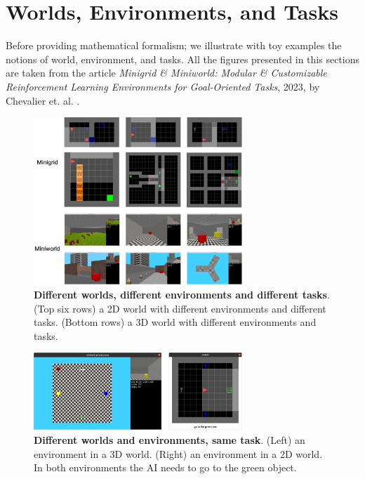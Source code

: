 \documentclass[10pt]{article} %
\begin{document}
\section{Worlds, Environments, and Tasks}
Before providing mathematical formalism; we illustrate with toy examples the notions of world, environment, and tasks.
All the figures presented in this sections are taken from the article \textit{Minigrid \& Miniworld: Modular \& Customizable Reinforcement Learning Environments for Goal-Oriented Tasks}, 2023, by Chevalier et. al. .
\begin{figure}
\centering
\includegraphics[width=0.7\textwidth]{figures/minigrid_miniworld_alt.png}
\caption{\textbf{Different worlds, different environments and different tasks}. (Top six rows) a 2D world with different environments and different tasks.
(Bottom rows) a 3D world with different environments and tasks.}
\end{figure}

\begin{figure}
  \centering
  \includegraphics[width=0.7\textwidth]{figures/transfer_envs.png}
  \caption{\textbf{Different worlds and environments, same task}. (Left) an environment in a 3D world. (Right) an environment in a 2D world. 
  In both environments the AI needs to go to the green object.
  }
  \end{figure}
\end{document}
